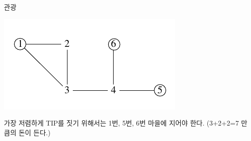 \begin{problem}{관광}
	\Examples
		
	\begin{example}
	\end{example}
	
	\Note
	
	\includegraphics[]{tur.png}
	
	가장 저렴하게 TIP를 짓기 위해서는 1번, 5번, 6번 마을에 지어야 한다. (3+2+2=7 만큼의 돈이 든다.)
	
\end{problem}

